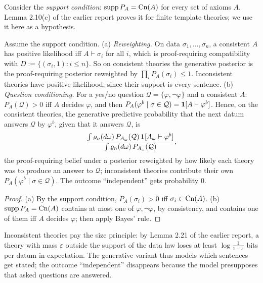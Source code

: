 Consider the \emph{support condition}: $\operatorname{supp} P_A=\mathrm{Cn}(A)$ for every set of axioms $A$. Lemma 2.10(c) of the earlier report proves it for finite template theories; we use it here as a hypothesis.

\begin{proposition}\label{prop:basic:generative}
Assume the support condition.
(a) \emph{Reweighting.} On data $\sigma_1,\dots,\sigma_n$, a consistent $A$ has positive likelihood iff $A\vdash\sigma_i$ for all $i$, which is proof-requiring compatibility with $D:=\{(\sigma_i,1):i\le n\}$. So on consistent theories the generative posterior is the proof-requiring posterior reweighted by $\prod_iP_A(\sigma_i)\le1$. Inconsistent theories have positive likelihood, since their support is every sentence.
(b) \emph{Question conditioning.} For a yes/no question $\mathcal Q=\{\varphi,\neg\varphi\}$ and a consistent $A$: $P_A(\mathcal Q)>0$ iff $A$ decides $\varphi$, and then $P_A(\varphi^b\mid\sigma\in\mathcal Q)=\mathbf{1}[A\vdash\varphi^b]$. Hence, on the consistent theories, the generative predictive probability that the next datum answers $\mathcal Q$ by $\varphi^b$, given that it answers $\mathcal Q$, is
\[
\frac{\int\varrho_n(d\omega)\,P_{A_\omega}(\mathcal Q)\,\mathbf{1}[A_\omega\vdash\varphi^b]}{\int\varrho_n(d\omega)\,P_{A_\omega}(\mathcal Q)},
\]
the proof-requiring belief under a posterior reweighted by how likely each theory was to produce an answer to $\mathcal Q$; inconsistent theories contribute their own $P_A(\varphi^b\mid\sigma\in\mathcal Q)$. The outcome ``independent'' gets probability $0$.
\end{proposition}

\begin{proof}
(a) By the support condition, $P_A(\sigma_i)>0$ iff $\sigma_i\in\mathrm{Cn}(A)$. (b) $\operatorname{supp} P_A=\mathrm{Cn}(A)$ contains at most one of $\varphi,\neg\varphi$, by consistency, and contains one of them iff $A$ decides $\varphi$; then apply Bayes' rule.
\end{proof}

Inconsistent theories pay the size principle: by Lemma 2.21 of the earlier report, a theory with mass $\varepsilon$ outside the support of the data law loses at least $\log\frac1{1-\varepsilon}$ bits per datum in expectation. The generative variant thus models which sentences get stated; the outcome ``independent'' disappears because the model presupposes that asked questions are answered.

